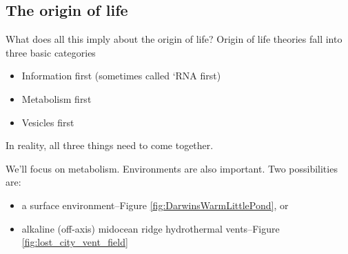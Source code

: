 \documentclass[]{article}
\begin{document}
\subsection{The origin of life}

What does all this imply about the origin of life? Origin of life theories fall into three basic categories
\begin{itemize}
	\item Information first (sometimes called ‘RNA first)
	\item Metabolism first
	\item Vesicles first
\end{itemize}
In reality, all three things need to come together. 

We'll focus on metabolism. Environments are also important. Two possibilities are:
\begin{itemize}
	\item  a surface environment--Figure \ref{fig:DarwinsWarmLittlePond}, or 
    \item alkaline (off-axis) midocean ridge hydrothermal vents--Figure \ref{fig:lost_city_vent_field}
\end{itemize}
\end{document}

